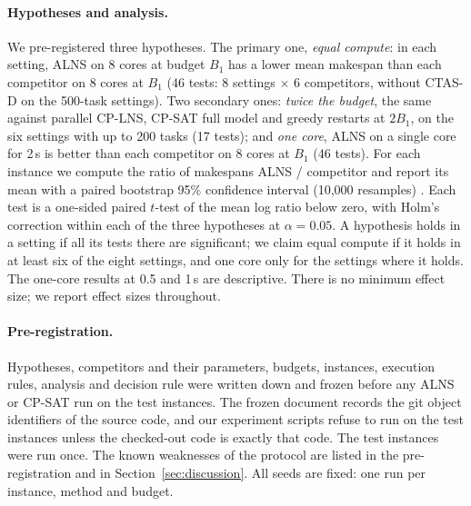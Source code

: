 \paragraph{Hypotheses and analysis.} We pre-registered three hypotheses. The primary one, \emph{equal compute}: in each
setting, ALNS on 8 cores at budget $B_1$ has a lower mean makespan than each competitor on 8 cores at $B_1$ (46 tests:
8 settings $\times$ 6 competitors, without CTAS-D on the 500-task settings). Two secondary ones: \emph{twice the
budget}, the same against parallel CP-LNS, CP-SAT full model and greedy restarts at $2B_1$, on the six settings with up
to 200 tasks (17 tests); and \emph{one core}, ALNS on a single core for 2\,s is better than each competitor on 8 cores
at $B_1$ (46 tests). For each
instance we compute the ratio of makespans ALNS / competitor and report its mean with a paired bootstrap 95\%
confidence interval (10,000 resamples) \cite{efron1993introduction}. Each test is a one-sided paired $t$-test of the
mean log ratio below zero, with Holm's correction \cite{holm1979simple} within each of the three hypotheses at
$\alpha = 0.05$. A hypothesis holds in a setting if all its tests there are significant; we claim equal compute if it
holds in at least six of the eight settings, and one core only for the settings where it holds. The one-core results at 0.5 and 1\,s are descriptive. There is no minimum effect size; we report effect sizes throughout.

\paragraph{Pre-registration.} Hypotheses, competitors and their parameters, budgets, instances, execution rules,
analysis and decision rule were written down and frozen before any ALNS or CP-SAT run on the test instances. The frozen
document records the git object identifiers of the source code, and our experiment scripts refuse to run on the test instances
unless the checked-out code is exactly that code. The test instances were run once. The known weaknesses of the
protocol are listed in the pre-registration and in Section~\ref{sec:discussion}. All seeds are fixed: one run per
instance, method and budget.
